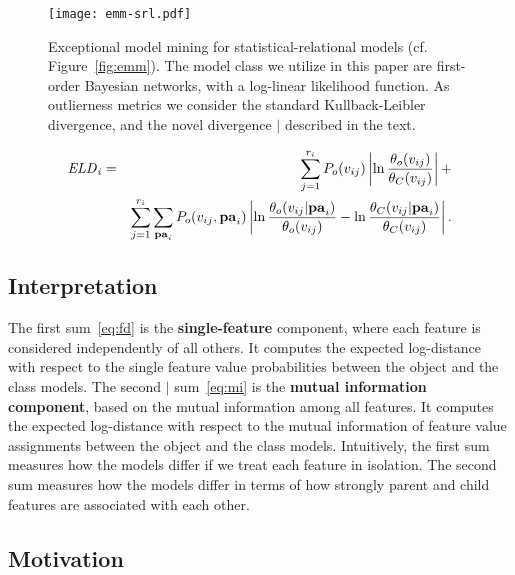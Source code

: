 {\begin{figure}[htbp]
	\centering
\texttt{[image: emm-srl.pdf]}
	\caption{Exceptional model mining for statistical-relational models (cf. Figure~\ref{fig:emm}). The model class we utilize in this paper are first-order Bayesian networks, with a log-linear likelihood function. As outlierness metrics we consider the standard Kullback-Leibler divergence, and the novel divergence $\mid$ described in the text.
		\label{fig:flow}}
\end{figure}


\begin{eqnarray}
\it{ELD}_{i} & = & \sum_{j=1}^{r_{i}} P_{o}(v_{ij}) \left|\ln \frac{\theta_{o}( v_{ij})}{\theta_{C}( v_{ij})}\right|+ \label{eq:fd}\\
& & \sum_{j=1}^{r_{i}} \sum_{\mathbf{pa}_{i}} 
P_{o}( v_{ij},\mathbf{pa}_{i})
\left|\ln \frac{\theta_{o}( v_{ij}|\mathbf{pa}_{i})}{\theta_{o}(v_{ij})} - \ln \frac{\theta_{C}( v_{ij}|\mathbf{pa}_{i})}{\theta_{C}(v_{ij})}\right|. \label{eq:mi}
\end{eqnarray}

\subsection{Interpretation}

The first sum~\eqref{eq:fd} is the \textbf{single-feature} component, where each feature is considered independently of all others. It computes the expected log-distance with respect to  the single feature value probabilities between the object and the class models. 
%
The second $\mid$ sum~\eqref{eq:mi} is the \textbf{mutual information component}, based on the mutual information among all features. It computes the expected log-distance with respect to the mutual information of feature value assignments between the object and the class models.
Intuitively, the first sum measures how the models differ if we treat each feature in isolation. The second sum measures how the models differ in terms of how strongly parent and child features are associated with each other. 


\subsection{Motivation} 

}
